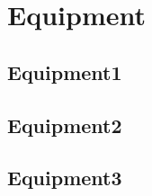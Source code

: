 \clearpage
\section{Equipment}
\lipsum[1]
\subsection{Equipment1}
\lipsum[2]
\subsection{Equipment2}
\lipsum[2]
\subsection{Equipment3}
\lipsum[2]